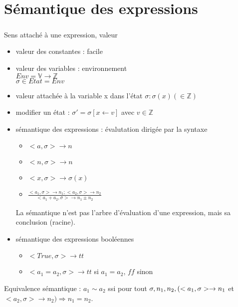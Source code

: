 \documentclass[10pt,a4paper]{article}
\begin{document}
\section{Sémantique des expressions}
\subparagraph*{} Sens attaché à une expression, valeur
\begin{itemize}
\item valeur des constantes : facile
\item valeur des variables : environnement \\
	$Env = \mathbb{V}\longrightarrow\mathbb{Z}$\\
	$ \sigma \in Etat = Env$ 
\item valeur attachée à la variable x dans l'état $\sigma : \sigma(x) \left( \in \mathbb{Z} \right)$
\item modifier un état : $\sigma ' = \sigma[x \leftarrow v]$ avec $v \in \mathbb{Z}$
\item sémantique des expressions : évalutation dirigée par la syntaxe\\
	\begin{itemize}
		\item $ <a, \sigma > \rightarrow n$ \\
		\item $ <n, \sigma > \rightarrow n$	\\
		\item $ <x, \sigma > \rightarrow \sigma(x)$\\
		\item $\displaystyle \frac{ <a_1, \sigma > \rightarrow n_1 ; <a_2, \sigma > \rightarrow n_2}{<a_1 + a_2, \sigma > \rightarrow n_1 \pm n_2}$\\
	\end{itemize}
\noindent La sémantique n'est pas l'arbre d'évaluation d'une expression, mais sa conclusion (racine).
	\item sémantique des expressions booléennes
		\begin{itemize}
			\item $<True, \sigma > \rightarrow tt$
			\item $<a_1 = a_2,  \sigma > \rightarrow tt$ si $a_1 = a_2$, $ff$ sinon
		\end{itemize}
\end{itemize}
\begin{definition}{Equivalence sémantique :}
$a_1 \sim a_2$ ssi pour tout $\sigma, n_1, n_2,\\ (<a_1, \sigma> \rightarrow n_1$ et $<a_2, \sigma> \rightarrow n_2 ) \Rightarrow n_1 = n_2$.\\
\end{definition}
\end{document}
